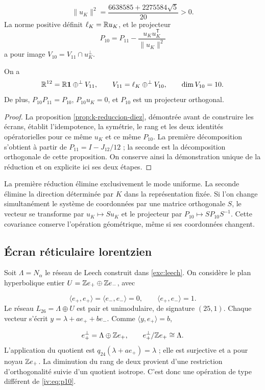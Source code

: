 \[
 \|u_K\|^2=\frac{6638585+2275584\sqrt5}{20}>0.
\]
La norme positive définit \(\ell_K=\mathbb R u_K\), et le
projecteur
\begin{equation}
 P_{10}=P_{11}-\frac{u_Ku_K^{\mathsf T}}{\|u_K\|^2}
 \label{iv:eq:p10}
\end{equation}
a pour image \(V_{10}=V_{11}\cap u_K^\perp\).

\begin{proposition}
\label{iv:prop:12-11-10}
On a
\[
 \mathbb R^{12}=\mathbb R\mathbf1\mathbin{\oplus^\perp}V_{11},\qquad
 V_{11}=\ell_K\mathbin{\oplus^\perp}V_{10},\qquad
 \dim V_{10}=10.
\]
De plus, \(P_{10}P_{11}=P_{10}\), \(P_{10}u_K=0\), et
\(P_{10}\) est un projecteur orthogonal.
\end{proposition}
\begin{proof}
La proposition \ref{prop:k-reduccion-diez}, démontrée avant de
construire les écrans, établit l’idempotence, la symétrie, le rang et
les deux identités opératorielles pour ce même \(u_K\) et ce même
\(P_{10}\). La première décomposition s’obtient à partir de
\(P_{11}=I-J_{12}/12\) ; la seconde est la décomposition orthogonale
de cette proposition. On conserve ainsi la démonstration unique de la
réduction et on explicite ici ses deux étapes.
\end{proof}

La première réduction élimine exclusivement le mode uniforme.
La seconde élimine la direction déterminée par \(K\) dans
la représentation fixée. Si l’on change simultanément le système de coordonnées
par une matrice orthogonale \(S\), le vecteur se transforme par
\(u_K\mapsto Su_K\) et le projecteur par
\(P_{10}\mapsto SP_{10}S^{-1}\). Cette covariance conserve
l’opération géométrique, même si ses coordonnées changent.

\subsection{Écran réticulaire lorentzien
}

Soit \(\Lambda=N_\alpha\) le réseau de Leech construit
dans \ref{exc:leech}. On considère le plan hyperbolique entier
\(U=\mathbb Z e_+\oplus\mathbb Z e_-\), avec

\[
 \langle e_+,e_+\rangle=\langle e_-,e_-\rangle=0,
 \qquad\langle e_+,e_-\rangle=1.
\]
Le réseau \(L_{26}=\Lambda\oplus U\) est pair et
unimodulaire, de signature \((25,1)\). Chaque vecteur s’écrit
\(y=\lambda+ae_++be_-\). Comme
\(\langle y,e_+\rangle=b\),

\begin{equation}
 e_+^\perp=\Lambda\oplus\mathbb Z e_+,
 \qquad e_+^\perp/\mathbb Z e_+\cong\Lambda.
 \label{iv:eq:26-24}
\end{equation}
L’application du quotient est
\(q_{24}(\lambda+ae_+)=\lambda\) ; elle est surjective et a pour
noyau \(\mathbb Z e_+\). La diminution du rang de deux provient
d’une restriction d’orthogonalité suivie d’un quotient
isotrope. C’est donc une opération de type différent de
\eqref{iv:eq:p10}.

